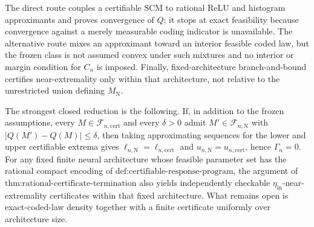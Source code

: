 The direct route couples a certifiable SCM to rational ReLU and histogram approximants and proves convergence of \(Q\); it stops at exact feasibility because convergence against a merely measurable coding indicator is unavailable.  The alternative route mixes an approximant toward an interior feasible coded law, but the frozen class is not assumed convex under such mixtures and no interior or margin condition for \(C_n\) is imposed.  Finally, fixed-architecture branch-and-bound certifies near-extremality only within that architecture, not relative to the unrestricted union defining \(M_{\mathrm N}\).

The strongest closed reduction is the following.  If, in addition to the frozen assumptions, every \(M\in\mathcal F_{n,\mathrm{cert}}\) and every \(\delta>0\) admit \(M'\in\mathcal F_{n,\mathrm N}\) with \(|Q(M')-Q(M)|\leq\delta\), then taking approximating sequences for the lower and upper certifiable extrema gives \(\ell_{n,\mathrm N}=\ell_{n,\mathrm{cert}}\) and \(u_{n,\mathrm N}=u_{n,\mathrm{cert}}\), hence \(\Gamma_n=0\).  For any fixed finite neural architecture whose feasible parameter set has the rational compact encoding of \(\text{def:certifiable-response-program}\), the argument of \(\text{thm:rational-certificate-termination}\) also yields independently checkable \(\eta_{\mathrm{in}}\)-near-extremality certificates within that fixed architecture.  What remains open is exact-coded-law density together with a finite certificate uniformly over architecture size.
